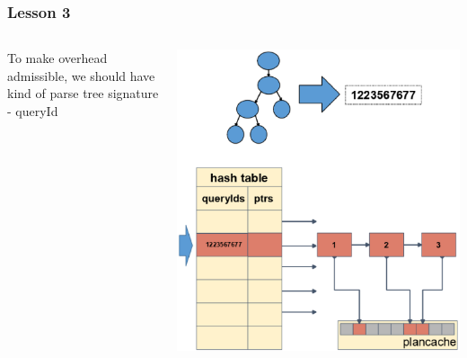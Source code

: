 \documentclass{beamer}
\begin{document}
\begin{frame}[fragile]\frametitle{Lesson 3}
\begin{columns}\begin{column}{0.5\textwidth}
To make overhead admissible, we should have kind of parse tree signature - queryId
\end{column}\begin{column}{0.5\textwidth}
  \begin{center}
    \includegraphics[scale=0.35]{queryid}
  \end{center}
\end{column}\end{columns}
\end{frame}
\end{document}
